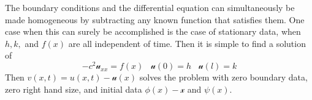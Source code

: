 The boundary conditions and the differential equation can simultaneously be made homogeneous by subtracting any known function that satisfies them. One case when this can surely be accomplished is the case of stationary data, when $h,k,$ and $f(x)$ are all independent of time. Then it is simple to find a solution of \begin{equation*}
    -c^2\mathscr{u}_{xx} = f(x)\;\;\;\mathscr{u}(0) = h\;\;\;\mathscr{u}(l) = k
\end{equation*}
Then $v(x,t) = u(x,t) - \mathscr{u}(x)$ solves the problem with zero boundary data, zero right hand size, and initial data $\phi(x) - \mathscr{x}$ and $\psi(x)$.



